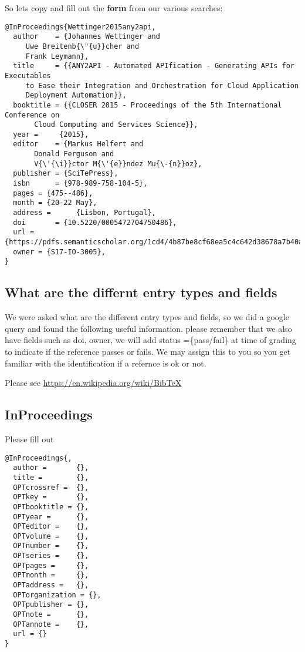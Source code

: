 So lets copy and fill out the \textbf{form} from our various searches:

\begin{verbatim}
@InProceedings{Wettinger2015any2api,    
  author    = {Johannes Wettinger and
     Uwe Breitenb{\"{u}}cher and
     Frank Leymann},
  title     = {{ANY2API - Automated APIfication - Generating APIs for Executables
     to Ease their Integration and Orchestration for Cloud Application
     Deployment Automation}},
  booktitle = {{CLOSER 2015 - Proceedings of the 5th International Conference on
       Cloud Computing and Services Science}},
  year =     {2015},
  editor    = {Markus Helfert and
       Donald Ferguson and
       V{\'{\i}}ctor M{\'{e}}ndez Mu{\-{n}}oz},
  publisher = {SciTePress},
  isbn      = {978-989-758-104-5},
  pages = {475--486},
  month = {20-22 May},
  address =      {Lisbon, Portugal},
  doi       = {10.5220/0005472704750486},
  url ={https://pdfs.semanticscholar.org/1cd4/4b87be8cf68ea5c4c642d38678a7b40a86de.pdf},
  owner = {S17-IO-3005},
}
\end{verbatim}

\subsection{What are the differnt entry types and
fields}\label{what-are-the-differnt-entry-types-and-fields}

We were asked what are the different entry types and fields, so we did a
google query and found the following useful information. please remember
that we also have fields such as doi, owner, we will add status
=\{pass/fail\} at time of grading to indicate if the reference passes or
fails. We may assign this to you so you get familiar with the
identification if a refernce is ok or not.

Please see \url{https://en.wikipedia.org/wiki/BibTeX}

\subsection{InProceedings}\label{inproceedings}

Please fill out

\begin{verbatim}
@InProceedings{,
  author =       {},
  title =        {},
  OPTcrossref =  {},
  OPTkey =       {},
  OPTbooktitle = {},
  OPTyear =      {},
  OPTeditor =    {},
  OPTvolume =    {},
  OPTnumber =    {},
  OPTseries =    {},
  OPTpages =     {},
  OPTmonth =     {},
  OPTaddress =   {},
  OPTorganization = {},
  OPTpublisher = {},
  OPTnote =      {},
  OPTannote =    {},
  url = {}
}
\end{verbatim}

